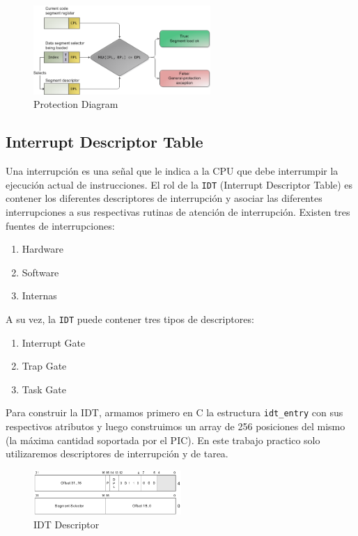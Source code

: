 \begin{figure}[H]
  \centering
    \includegraphics[width=0.6\textwidth]{images/protection}
  \caption{Protection Diagram}
\end{figure}

\subsection{Interrupt Descriptor Table}

Una interrupción es una señal que le indica a la CPU que debe interrumpir la ejecución actual de instrucciones. El rol de la \texttt{IDT} (Interrupt Descriptor Table) es contener los diferentes descriptores de interrupción y asociar las diferentes interrupciones a sus respectivas rutinas de atención de interrupción. Existen tres fuentes de interrupciones:

\begin{enumerate}
\item Hardware
\item Software
\item Internas
\end{enumerate}

A su vez, la \texttt{IDT} puede contener tres tipos de descriptores:

\begin{enumerate}
\item Interrupt Gate
\item Trap Gate
\item Task Gate
\end{enumerate}

Para construir la IDT, armamos primero en C la estructura \texttt{idt\_entry} con sus respectivos atributos y luego construimos un array de 256 posiciones del mismo (la máxima cantidad soportada por el PIC). En este trabajo practico solo utilizaremos descriptores de interrupción y de tarea.

\begin{figure}[h!]
  \centering
    \includegraphics[width=0.5\textwidth]{images/idt_desc}
  \caption{IDT Descriptor}
\end{figure}

